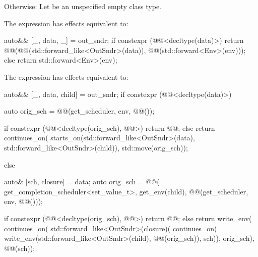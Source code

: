 \pnum
Otherwise:
Let  be an unspecified empty class type.

\pnum
The expression 
has effects equivalent to:
\begin{codeblock}
auto&& [_, data, _] = out_sndr;
if constexpr (@@<decltype(data)>) {
  return @@(@@(std::forward_like<OutSndr>(data)), @@(std::forward<Env>(env)));
} else {
  return std::forward<Env>(env);
}
\end{codeblock}

\pnum
The expression 
has effects equivalent to:
\begin{codeblock}
auto&& [_, data, child] = out_sndr;
if constexpr (@@<decltype(data)>) {
  auto orig_sch =
    @@(get_scheduler, env, @@());

  if constexpr (@@<decltype(orig_sch), @@>) {
    return @@{};
  } else {
    return continues_on(
      starts_on(std::forward_like<OutSndr>(data), std::forward_like<OutSndr>(child)),
      std::move(orig_sch));
  }
} else {
  auto& [sch, closure] = data;
  auto orig_sch = @@(
    get_completion_scheduler<set_value_t>,
    get_env(child),
    @@(get_scheduler, env, @@()));

  if constexpr (@@<decltype(orig_sch), @@>) {
    return @@{};
  } else {
    return write_env(
      continues_on(
        std::forward_like<OutSndr>(closure)(
          continues_on(
            write_env(std::forward_like<OutSndr>(child), @@(orig_sch)),
            sch)),
        orig_sch),
      @@(sch));
  }
}
\end{codeblock}

